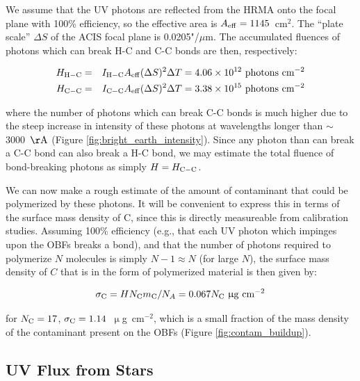 \documentclass[11pt]{article}
\begin{document}
We assume that the UV photons are reflected from the HRMA onto the focal plane with 100\% efficiency,
so the effective area is $A_{\rm eff} = 1145$~cm$^2$. The ``plate scale'' $\Delta{S}$ of the ACIS focal plane is
0.0205"/$\mu$m. The accumulated fluences of photons which can break H-C and C-C bonds are then, respectively:

\begin{eqnarray}
H_{\rm H-C} &=& I_{\rm H-C}A_{\rm eff}(\Delta{S})^2\Delta{T} = 4.06 \times 10^{12}~{\rm photons~cm^{-2}} \\
H_{\rm C-C} &=& I_{\rm C-C}A_{\rm eff}(\Delta{S})^2\Delta{T} = 3.38 \times 10^{15}~{\rm photons~cm^{-2}}\label{eqn:fluence}
\end{eqnarray}

\noindent
where the number of photons which can break C-C bonds is much higher due to the steep increase in intensity of these photons at wavelengths longer than $\sim$3000~${\rm \AA}$ (Figure \ref{fig:bright_earth_intensity}). Since any photon than can break a C-C bond can also break a H-C bond, we may estimate the total fluence of bond-breaking photons as simply $H = H_{\rm C-C}$.

We can now make a rough estimate of the amount of contaminant that could be polymerized by these photons. It
will be convenient to express this in terms of the surface mass density of C, since this is directly
measureable from calibration studies. Assuming 100\% efficiency (e.g., that each UV photon which impinges upon the OBFs breaks a bond), and that the number of photons required to polymerize $N$ molecules is simply $N-1 \approx N$ (for large $N$), the surface mass density of $C$ that is in the form of polymerized material is then given by:

\begin{equation}\label{eqn:pred_poly}
\sigma_{\rm C} = HN_{\rm C}m_{\rm C}/N_A = 0.067N_{\rm C}~\upmu{\rm g~cm}^{-2}
\end{equation}

\noindent
for $N_{\rm C} = 17$, $\sigma_{\rm C} = 1.14$~$\upmu$g~cm$^{-2}$, which is a small fraction of the mass density
of the contaminant present on the OBFs (Figure \ref{fig:contam_buildup}).

\subsection{UV Flux from Stars}
\end{document}
